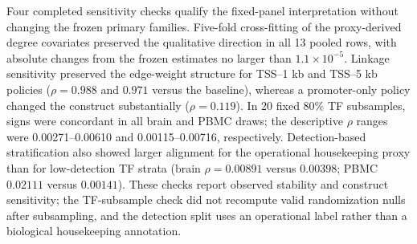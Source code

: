 \documentclass[fleqn,10pt,lineno]{wlpeerj}
\begin{document}
Four completed sensitivity checks qualify the fixed-panel interpretation without changing the
frozen primary families. Five-fold cross-fitting of the proxy-derived degree covariates preserved the
qualitative direction in all 13 pooled rows, with absolute changes from the frozen estimates no larger
than $1.1\times10^{-5}$. Linkage sensitivity preserved the edge-weight structure for TSS--1 kb
and TSS--5 kb policies ($\rho=0.988$ and $0.971$ versus the baseline), whereas a promoter-only policy
changed the construct substantially ($\rho=0.119$). In 20 fixed 80\% TF subsamples, signs were
concordant in all brain and PBMC draws; the descriptive $\rho$ ranges were 0.00271--0.00610 and
0.00115--0.00716, respectively. Detection-based stratification also showed larger alignment for
the operational housekeeping proxy than for low-detection TF strata (brain $\rho=0.00891$ versus
$0.00398$; PBMC $0.02111$ versus $0.00141$). These checks report observed stability and
construct sensitivity; the TF-subsample check did not recompute valid randomization nulls after
subsampling, and the detection split uses an operational label rather than a biological housekeeping
annotation.
\end{document}

